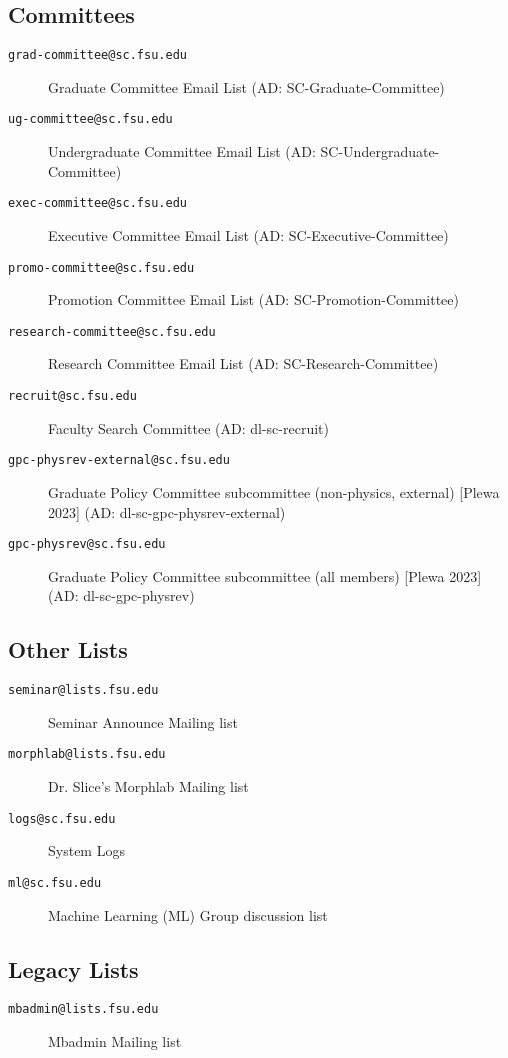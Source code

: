 \documentclass[12pt,a4paper]{article}
\begin{document}
\subsection{Committees}
\begin{description}
    \item[\texttt{grad-committee@sc.fsu.edu}] Graduate Committee Email List (AD: SC-Graduate-Committee)
    \item[\texttt{ug-committee@sc.fsu.edu}] Undergraduate Committee Email List (AD: SC-Undergraduate-Committee)
    \item[\texttt{exec-committee@sc.fsu.edu}] Executive Committee Email List (AD: SC-Executive-Committee)
    \item[\texttt{promo-committee@sc.fsu.edu}] Promotion Committee Email List (AD: SC-Promotion-Committee)
    \item[\texttt{research-committee@sc.fsu.edu}] Research Committee Email List (AD: SC-Research-Committee)
    \item[\texttt{recruit@sc.fsu.edu}] Faculty Search Committee (AD: dl-sc-recruit)
    \item[\texttt{gpc-physrev-external@sc.fsu.edu}] Graduate Policy Committee subcommittee (non-physics, external) [Plewa 2023] (AD: dl-sc-gpc-physrev-external)
    \item[\texttt{gpc-physrev@sc.fsu.edu}] Graduate Policy Committee subcommittee (all members) [Plewa 2023] (AD: dl-sc-gpc-physrev)
\end{description}

\subsection{Other Lists}
\begin{description}
    \item[\texttt{seminar@lists.fsu.edu}] Seminar Announce Mailing list
    \item[\texttt{morphlab@lists.fsu.edu}] Dr. Slice's Morphlab Mailing list
    \item[\texttt{logs@sc.fsu.edu}] System Logs
    \item[\texttt{ml@sc.fsu.edu}] Machine Learning (ML) Group discussion list
\end{description}

\subsection{Legacy Lists}
\begin{description}
    \item[\texttt{mbadmin@lists.fsu.edu}] Mbadmin Mailing list
\end{description}
\end{document}

